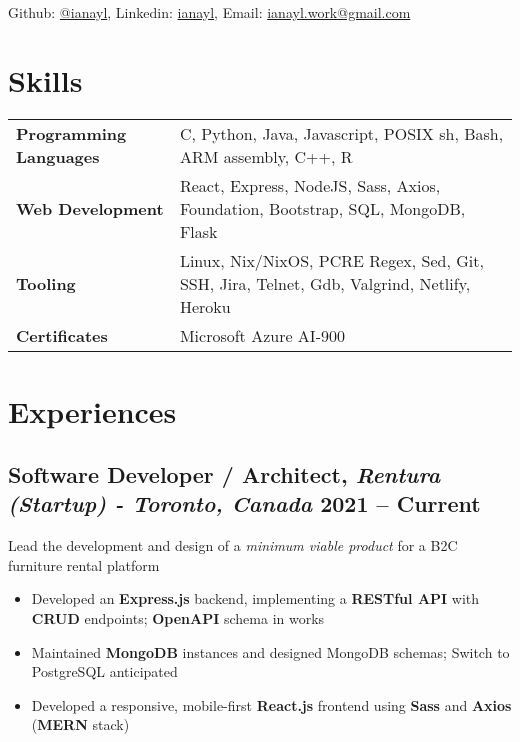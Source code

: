 \documentclass[9pt]{article}
\author{Ian Li}
\makeatletter
\renewcommand{\maketitle}{
		\vspace{-4em}
		{\huge\bfseries
		\theauthor}
    \vspace{0.2em}
    \\
    Github: \href{https://github.com/ianayl}{@ianayl}, Linkedin: \href{https://www.linkedin.com/in/ianayl}{ianayl}, Email: \url{ianayl.work@gmail.com}
}
\makeatother
\begin{document}
\maketitle


\section{Skills}

\begin{tabular}{ l l }
    \textbf{Programming Languages} & C, Python, Java, Javascript, POSIX sh, Bash, ARM assembly, C++, R \\
    \textbf{Web Development} & React, Express, NodeJS, Sass, Axios, Foundation, Bootstrap, SQL, MongoDB, Flask \\
    \textbf{Tooling} & Linux, Nix/NixOS, PCRE Regex, Sed, Git, SSH, Jira, Telnet, Gdb, Valgrind, Netlify, Heroku \\
    \textbf{Certificates} & Microsoft Azure AI-900
\end{tabular}

\section*{Experiences}

\subsection{Software Developer / Architect, \textit{Rentura (Startup) - \normalsize\textit{Toronto, Canada}} \hfill \normalsize\textnormal{2021 -- Current}}
Lead the development and design of a \textit{minimum viable product} for a B2C furniture rental platform
\vspace{-0.5em}
\begin{itemize}
  \item Developed an \textbf{Express.js} backend, implementing a \textbf{RESTful API} with \textbf{CRUD} endpoints; \textbf{OpenAPI} schema in works
  \item Maintained \textbf{MongoDB} instances and designed MongoDB schemas; Switch to PostgreSQL anticipated
  \item Developed a responsive, mobile-first \textbf{React.js} frontend using \textbf{Sass} and \textbf{Axios} (\textbf{MERN} stack)
\end{itemize}
\end{document}
